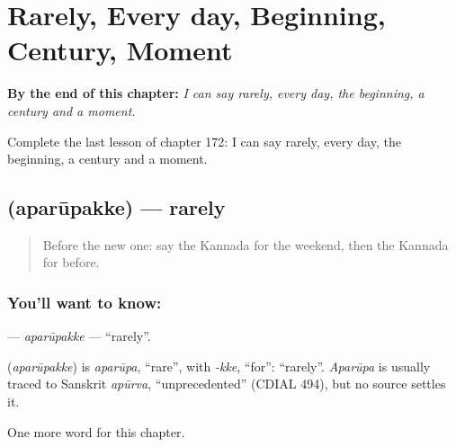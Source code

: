 
\chapter{Rarely, Every day, Beginning, Century, Moment}
\label{ch:ka-rarely-every-day-beginning-century-moment}

\begin{chapteropening}
\textbf{By the end of this chapter:} \emph{I can say rarely, every day, the beginning, a century and a moment.}

Complete the last lesson of chapter 172: I can say rarely, every day, the beginning, a century and a moment.
\end{chapteropening}

\section[\texorpdfstring{\kn{ಅಪರೂಪಕ್ಕೆ} (aparūpakke)}{ಅಪರೂಪಕ್ಕೆ (aparūpakke)}]{ (aparūpakke) — rarely}

\label{lesson:KA-C172-aparupakke}



\begin{quote}
Before the new one: say the Kannada for the weekend, then the Kannada for before.
\end{quote}

\subsection*{You'll want to know: }
\textbf{} — \emph{aparūpakke} — \textquotedblleft{}rarely\textquotedblright{}.

\begin{cousinweb}
\textbf{} (\emph{aparūpakke}) is \emph{aparūpa}, \textquotedblleft{}rare\textquotedblright{}, with \emph{-kke}, \textquotedblleft{}for\textquotedblright{}: \textquotedblleft{}rarely\textquotedblright{}. \emph{Aparūpa} is usually traced to Sanskrit \emph{apūrva}, \textquotedblleft{}unprecedented\textquotedblright{} (CDIAL 494), but no source settles it.
\end{cousinweb}

\begin{grammarlens}[title={What you've built}]
One more word for this chapter.
\end{grammarlens}

